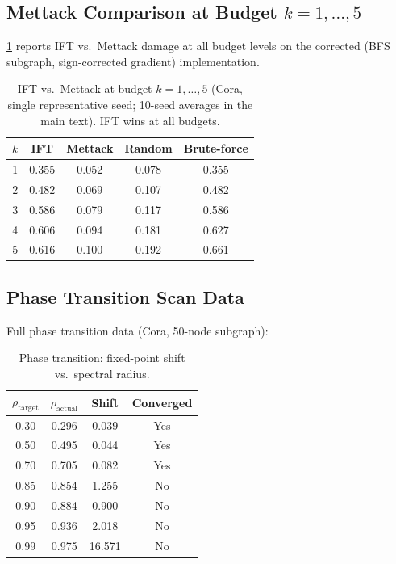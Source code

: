 \documentclass[conference]{IEEEtran}
\begin{document}
\subsection{Mettack Comparison at Budget $k = 1, \ldots, 5$}

\cref{tab:mettack_full} reports IFT vs.\ Mettack damage at all budget levels on the corrected (BFS subgraph, sign-corrected gradient) implementation.

\begin{table}[h]
\centering
\caption{IFT vs.\ Mettack at budget $k=1,\ldots,5$ (Cora, single representative seed; 10-seed averages in the main text). IFT wins at all budgets.}
\small
\begin{tabular}{@{}rcccc@{}}
\toprule
$k$ & IFT & Mettack & Random & Brute-force \\
\midrule
1 & 0.355 & 0.052 & 0.078 & 0.355 \\
2 & 0.482 & 0.069 & 0.107 & 0.482 \\
3 & 0.586 & 0.079 & 0.117 & 0.586 \\
4 & 0.606 & 0.094 & 0.181 & 0.627 \\
5 & 0.616 & 0.100 & 0.192 & 0.661 \\
\bottomrule
\end{tabular}
\label{tab:mettack_full}
\end{table}

\subsection{Phase Transition Scan Data}

Full phase transition data (Cora, 50-node subgraph):

\begin{table}[h]
\centering
\caption{Phase transition: fixed-point shift vs.\ spectral radius.}
\small
\begin{tabular}{@{}cccc@{}}
\toprule
$\rho_{\text{target}}$ & $\rho_{\text{actual}}$ & Shift & Converged \\
\midrule
0.30 & 0.296 & 0.039 & Yes \\
0.50 & 0.495 & 0.044 & Yes \\
0.70 & 0.705 & 0.082 & Yes \\
0.85 & 0.854 & 1.255 & No \\
0.90 & 0.884 & 0.900 & No \\
0.95 & 0.936 & 2.018 & No \\
0.99 & 0.975 & 16.571 & No \\
\bottomrule
\end{tabular}
\end{table}
\end{document}
